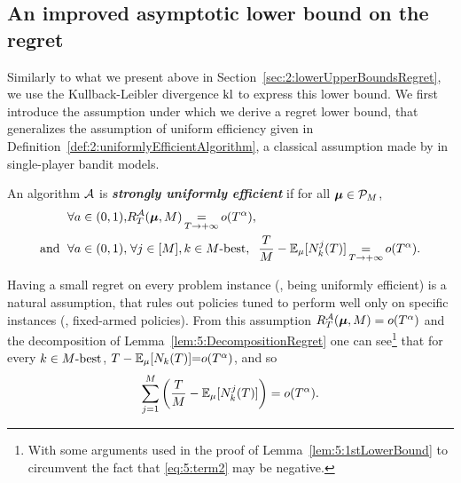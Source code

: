 \subsection{An improved asymptotic lower bound on the regret}
\label{sub:5:betterLowerBound}

Similarly to what we present above in Section~\ref{sec:2:lowerUpperBoundsRegret},
we use the Kullback-Leibler divergence $\mathrm{kl}$ to express this lower bound.
%
We first introduce the assumption under which we derive a regret lower bound, that generalizes the assumption of uniform efficiency given in Definition~\ref{def:2:uniformlyEfficientAlgorithm},
a classical assumption made by \cite{LaiRobbins85} in single-player bandit models.
%
\begin{definition}\label{def:5:DecentralizedUniformEfficiency}
\begin{leftbar}[defnbar]  %
  An algorithm $\mathcal{A}$  is \emph{\textbf{strongly uniformly efficient}} if for all $\boldsymbol{\mu} \in \mathcal{P}_M$,
  \begin{align}
    \forall a\in(0,1), & R_T^{\mathcal{A}}(\boldsymbol{\mu},M) \mathop{=}\limits_{T \to +\infty} o(T^\alpha), \\
    \text{and } \; \forall a\in(0,1), & \;
    \forall j \in [M], k \in M\text{-}\mathrm{best}, \;\;
    \frac{T}{M}
    - \mathbb{E}_{\mu}[N_k^j(T)] \mathop{=}\limits_{T \to +\infty} o(T^{\alpha}).
    \label{eq:5:SUE}
  \end{align}
\end{leftbar}  %
\end{definition}


Having a small regret on every problem instance (\ie, being uniformly efficient)
is a natural assumption,
that rules out policies tuned to perform well only on specific instances (\eg, fixed-armed policies).
%
From this assumption $R_T^{\mathcal{A}}(\boldsymbol{\mu},M)=o(T^\alpha)$ and the decomposition of Lemma~\ref{lem:5:DecompositionRegret} one can see\footnote{With some arguments used in the proof of Lemma~\ref{lem:5:1stLowerBound} to circumvent the fact that \ref{eq:5:term2} may be negative.} that for every $k \in M\text{-}\mathrm{best}$,
${T}- \mathbb{E}_{\mu}[N_k(T)] {=} o(T^{\alpha})$, and so
\begin{equation}\label{eq:5:intermediate}
  \sum_{j =1}^M\left(\frac{T}{M} - \mathbb{E}_{\mu}[N_k^j(T)]\right) = o(T^{\alpha}).
\end{equation}

